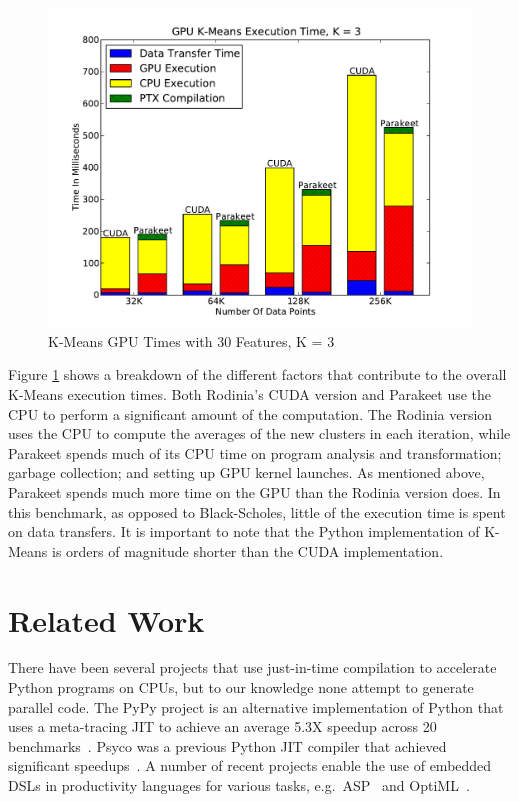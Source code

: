 \documentclass[10pt,twocolumn]{article}
\begin{document}
\begin{figure}
\includegraphics[scale=0.4]{KMGPU.pdf}
\caption{K-Means GPU Times with 30 Features, K = 3}
\label{KMGPU}
\end{figure}

Figure \ref{KMGPU} shows a breakdown of the different factors that contribute to the overall K-Means execution times.  Both Rodinia's CUDA version and Parakeet use the CPU to perform a significant amount of the computation.  The Rodinia version uses the CPU to compute the averages of the new clusters in each iteration, while Parakeet spends much of its CPU time on program analysis and transformation; garbage collection; and setting up GPU kernel launches.  As mentioned above, Parakeet spends much more time on the GPU than the Rodinia version does. In this benchmark, as opposed to Black-Scholes, little of the execution time is spent on data transfers.  It is important to note that the Python implementation of K-Means is orders of magnitude shorter than the CUDA implementation.

\section{Related Work}
\label{RelatedWork}
There have been several projects that use just-in-time compilation to accelerate Python programs on CPUs, but to our knowledge none attempt to generate parallel code.  The PyPy project is an alternative implementation of Python that uses a meta-tracing JIT to achieve an average 5.3X speedup across 20 benchmarks~\cite{Rigo06}. Psyco was a previous Python JIT compiler that achieved significant speedups~\cite{Rigo04}.  A number of recent projects enable the use of embedded DSLs in productivity languages for various tasks, e.g.~ASP~\cite{Cook11} and OptiML~\cite{Chaf11}.
\end{document}
